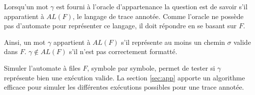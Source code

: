 Lorsqu'un mot $\gamma$ est fourni à l'oracle d'appartenance la question est de savoir s'il apparatient à $AL(F)$, le langage de trace annotée. Comme l'oracle ne possède pas d'automate pour représenter ce langage, il doit répondre en se basant sur $F$.

Ainsi, un mot $\gamma$ appartient à $AL(F)$ s'il représente au moins un chemin $\sigma$ valide dans $F$. $\gamma\notin AL(F)$ s'il n'est pas correctement formatté.

Simuler l'automate à files $F$, symbole par symbole, permet de tester si $\gamma$ représente bien une exécution valide. La section \ref{sec:app} apporte un algorithme efficace pour simuler les différentes exécutions possibles pour une trace annotée.
